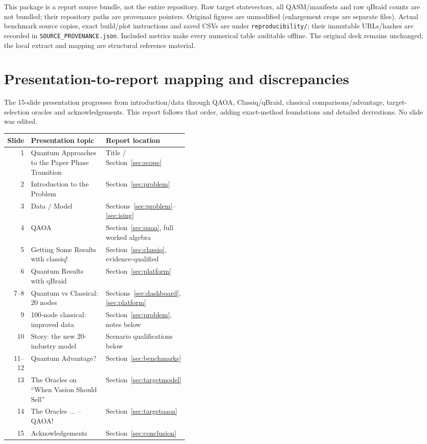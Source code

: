 \documentclass[11pt,letterpaper]{article}
\newcommand{\page}{\clearpage}
\newcommand{\file}[1]{\nolinkurl{#1}}
\begin{document}
This package is a report source bundle, not the entire repository. Raw target statevectors, all QASM/manifests and raw qBraid counts are not bundled; their repository paths are provenance pointers. Original figures are unmodified (enlargement crops are separate files). Actual benchmark source copies, exact build/plot instructions and saved CSVs are under \file{reproducibility/}; their immutable URLs/hashes are recorded in \file{SOURCE_PROVENANCE.json}. Included metrics make every numerical table auditable offline. The original deck remains unchanged; the local extract and mapping are structural reference material.
\page
\section{Presentation-to-report mapping and discrepancies}\label{sec:mapping}
The 15-slide presentation \cite{presentation} progresses from introduction/data through QAOA, Classiq/qBraid, classical comparisons/advantage, target-selection oracles and acknowledgements. This report follows that order, adding exact-method foundations and detailed derivations. No slide was edited.
\begin{center}\small
\begin{tabularx}{\linewidth}{@{}r p{0.43\linewidth}X@{}}\toprule
Slide & Presentation topic & Report location\\\midrule
1 & Quantum Approaches to the Paper Phase Transition & Title / Section~\ref{sec:scope}\\
2 & Introduction to the Problem & Section~\ref{sec:problem}\\
3 & Data / Model & Sections~\ref{sec:problem}--\ref{sec:ising}\\
4 & QAOA & Section~\ref{sec:qaoa}, full worked algebra\\
5 & Getting Some Results with classiq! & Section~\ref{sec:classiq}, evidence-qualified\\
6 & Quantum Results with qBraid & Section~\ref{sec:platform}\\
7--8 & Quantum vs Classical: 20 nodes & Sections~\ref{sec:dashboard}, \ref{sec:platform}\\
9 & 100-node classical: improved data & Section~\ref{sec:problem}, notes below\\
10 & Story: the new 20-industry model & Scenario qualifications below\\
11--12 & Quantum Advantage? & Section~\ref{sec:benchmarks}\\
13 & The Oracles on ``When Vasion Should Sell'' & Section~\ref{sec:targetmodel}\\
14 & The Oracles ... -- QAOA! & Section~\ref{sec:targetqaoa}\\
15 & Acknowledgements & Section~\ref{sec:conclusion}\\\bottomrule
\end{tabularx}\end{center}
\end{document}
